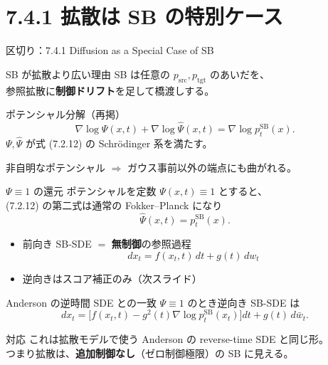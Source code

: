 \section{7.4.1 拡散は SB の特別ケース}
\asmain
\begin{frame}{区切り：7.4.1 Diffusion as a Special Case of SB}
    \tableofcontents[currentsection]
\end{frame}
\asmain
\begin{frame}{SB が拡散より広い理由}
    SB は任意の $p_{\mathrm{src}},p_{\mathrm{tgt}}$ のあいだを、\\
    参照拡散に\textbf{制御ドリフト}を足して橋渡しする。
    \begin{block}{ポテンシャル分解（再掲）}
        \[
            \nabla\log\Psi(x,t)+\nabla\log\widehat\Psi(x,t)
            =
            \nabla\log p_t^{\mathrm{SB}}(x).
        \]
        $\Psi,\widehat\Psi$ が式 (7.2.12) の Schrödinger 系を満たす。
    \end{block}
    非自明なポテンシャル $\Rightarrow$ ガウス事前以外の端点にも曲がれる。
\end{frame}
\asmain
\begin{frame}{$\Psi\equiv 1$ の還元}
    ポテンシャルを定数 $\Psi(x,t)\equiv 1$ とすると、\\
    (7.2.12) の第二式は通常の Fokker--Planck になり
    \[
        \widehat\Psi(x,t)=p_t^{\mathrm{SB}}(x).
        \tag{7.4.1}
    \]
    \begin{itemize}
        \item 前向き SB-SDE $=$ \textbf{無制御}の参照過程
        \[
            dx_t=f(x_t,t)\,dt+g(t)\,dw_t
        \]
        \item 逆向きはスコア補正のみ（次スライド）
    \end{itemize}
\end{frame}
\asmain
\begin{frame}{Anderson の逆時間 SDE との一致}
    $\Psi\equiv 1$ のとき逆向き SB-SDE は
    \[
        dx_t
        =
        \bigl[
            f(x_t,t)
            -
            g^{2}(t)\nabla\log p_t^{\mathrm{SB}}(x_t)
        \bigr]dt
        +
        g(t)\,d\bar w_t.
    \]
    \begin{exampleblock}{対応}
        これは拡散モデルで使う Anderson の reverse-time SDE と同じ形。\\
        つまり拡散は、\textbf{追加制御なし}（ゼロ制御極限）の SB に見える。
    \end{exampleblock}
\end{frame}
